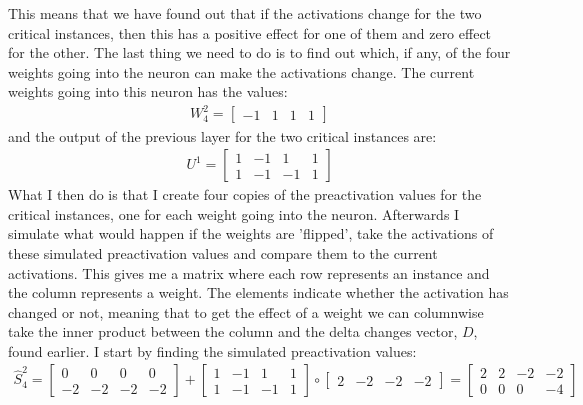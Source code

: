 This means that we have found out that if the activations change for the two critical instances, then this has a positive effect for one of them and zero effect for the other. The last thing we need to do is to find out which, if any, of the four weights going into the neuron can make the activations change. The current weights going into this neuron has the values: 
\begin{align*}
    W_4^2 = 
    \begin{bmatrix}
        -1 & 1 & 1 & 1
    \end{bmatrix}
\end{align*}
and the output of the previous layer for the two critical instances are:
\begin{align*}
    U^1 = 
    \begin{bmatrix}
        1 & -1 & 1 & 1 \\
        1 & -1 & -1 & 1
    \end{bmatrix}
\end{align*}
What I then do is that I create four copies of the preactivation values for the critical instances, one for each weight going into the neuron. Afterwards I simulate what would happen if the weights are 'flipped', take the activations of these simulated preactivation values and compare them to the current activations. This gives me a matrix where each row represents an instance and the column represents a weight. The elements indicate whether the activation has changed or not, meaning that to get the effect of a weight we can columnwise take the inner product between the column and the delta changes vector, $D$, found earlier. I start by finding the simulated preactivation values:
\begin{align*}
    \hat{S}^2_4 = 
    \begin{bmatrix}
        0 & 0 & 0 & 0 \\
        -2 & -2 & -2 & -2
    \end{bmatrix}
    + 
    \begin{bmatrix}
        1 & -1 & 1 & 1 \\
        1 & -1 & -1 & 1
    \end{bmatrix}
    \circ 
    \begin{bmatrix}
        2 & -2 & -2 & -2
    \end{bmatrix}
    =
    \begin{bmatrix}
        2 & 2 & -2 & -2 \\
        0 & 0 & 0 & -4
    \end{bmatrix}
\end{align*}
